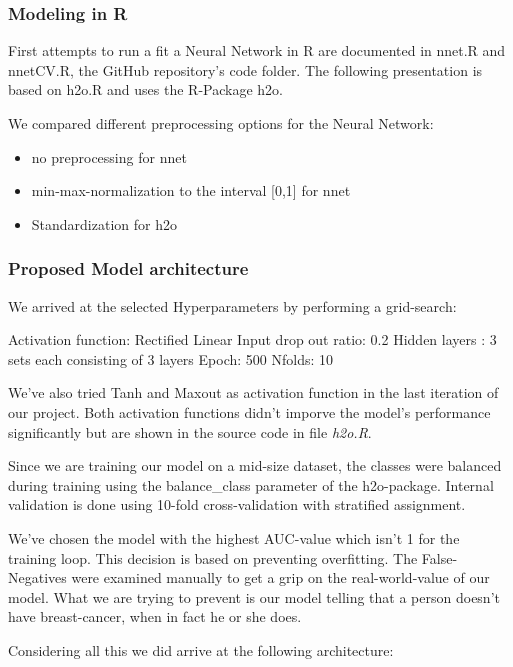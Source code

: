 \documentclass[]{article}
\providecommand{\tightlist}{%
  \setlength{\itemsep}{0pt}\setlength{\parskip}{0pt}}
\begin{document}
\subsubsection{Modeling in R}\label{modeling-in-r-1}

First attempts to run a fit a Neural Network in R are documented in
nnet.R and nnetCV.R, the GitHub repository's code folder. The following
presentation is based on h2o.R and uses the R-Package h2o.

We compared different preprocessing options for the Neural Network:

\begin{itemize}
\tightlist
\item
  no preprocessing for nnet
\item
  min-max-normalization to the interval {[}0,1{]} for nnet
\item
  Standardization for h2o
\end{itemize}

\subsubsection{Proposed Model
architecture}\label{proposed-model-architecture}

We arrived at the selected Hyperparameters by performing a grid-search:

Activation function: Rectified Linear Input drop out ratio: 0.2 Hidden
layers : 3 sets each consisting of 3 layers Epoch: 500 Nfolds: 10

We've also tried Tanh and Maxout as activation function in the last
iteration of our project. Both activation functions didn't imporve the
model's performance significantly but are shown in the source code in
file \emph{h2o.R}.

Since we are training our model on a mid-size dataset, the classes were
balanced during training using the balance\_class parameter of the
h2o-package. Internal validation is done using 10-fold cross-validation
with stratified assignment.

We've chosen the model with the highest AUC-value which isn't 1 for the
training loop. This decision is based on preventing overfitting. The
False-Negatives were examined manually to get a grip on the
real-world-value of our model. What we are trying to prevent is our
model telling that a person doesn't have breast-cancer, when in fact he
or she does.

Considering all this we did arrive at the following architecture:
\end{document}
